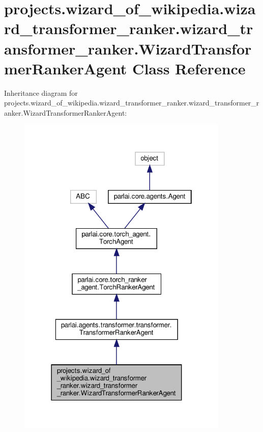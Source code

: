 \hypertarget{classprojects_1_1wizard__of__wikipedia_1_1wizard__transformer__ranker_1_1wizard__transformer__rad02f16524e5e0423aa3e2c69e1330ee1}{}\section{projects.\+wizard\+\_\+of\+\_\+wikipedia.\+wizard\+\_\+transformer\+\_\+ranker.\+wizard\+\_\+transformer\+\_\+ranker.\+Wizard\+Transformer\+Ranker\+Agent Class Reference}
\label{classprojects_1_1wizard__of__wikipedia_1_1wizard__transformer__ranker_1_1wizard__transformer__rad02f16524e5e0423aa3e2c69e1330ee1}


Inheritance diagram for projects.\+wizard\+\_\+of\+\_\+wikipedia.\+wizard\+\_\+transformer\+\_\+ranker.\+wizard\+\_\+transformer\+\_\+ranker.\+Wizard\+Transformer\+Ranker\+Agent\+:
\nopagebreak
\begin{figure}[H]
\begin{center}
\leavevmode
\includegraphics[width=286pt]{d7/ddc/classprojects_1_1wizard__of__wikipedia_1_1wizard__transformer__ranker_1_1wizard__transformer__ra3da4565eed5ada720d89b79c5b539029}
\end{center}
\end{figure}


